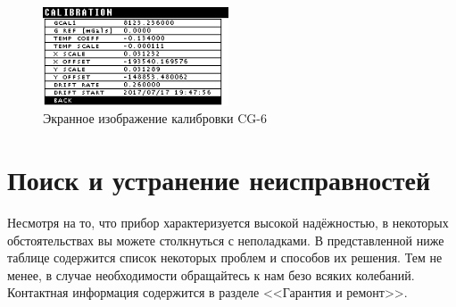 \begin{figure}[H]
  \centering
  \includegraphics[width=0.49\textwidth]{figures/the_cg6_calibration_screen}
  \caption{Экранное изображение калибровки CG-6}
  \label{fig:the_cg6_calibration_screen}
\end{figure}


\section{Поиск и устранение неисправностей}


Несмотря на то, что прибор \cg{} характеризуется высокой надёжностью, в некоторых
обстоятельствах вы можете столкнуться с неполадками. В представленной ниже
таблице содержится список некоторых проблем и способов их решения. Тем не менее,
в случае необходимости обращайтесь к нам безо всяких колебаний. Контактная
информация содержится в разделе <<Гарантия и ремонт>>.

